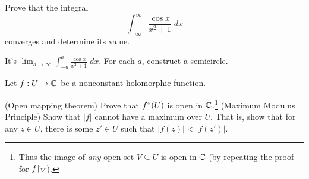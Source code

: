 \begin{problem}
	\yod
	Prove that the integral
	\[
		\int_{-\infty}^{\infty} \frac{\cos x}{x^2+1} \; dx
	\]
	converges and determine its value.
	\begin{hint}
		It's $\lim_{a \to \infty} \int_{-a}^{a} \frac{\cos x}{x^2+1} \; dx$.
		For each $a$, construct a semicircle.
	\end{hint}

\end{problem}

\begin{sproblem}
	\gim
	Let $f : U \to \mathbb C$ be a nonconstant holomorphic function.
	\begin{enumerate}[(a)]
		\ii (Open mapping theorem)
		Prove that $f``(U)$ is open in $\mathbb C$.\footnote{%
			Thus the image of \emph{any}
			open set $V \subseteq U$ is open in $\mathbb C$
			(by repeating the proof for $f \restrict{V}$).
		}
		\ii (Maximum Modulus Principle)
		Show that $\left\lvert f \right\rvert$
		cannot have a maximum over $U$.
		That is, show that for any $z \in U$, there is some $z' \in U$
		such that $\left\lvert f(z) \right\rvert < \left\lvert f(z') \right\rvert$.
	\end{enumerate}
\end{sproblem}
